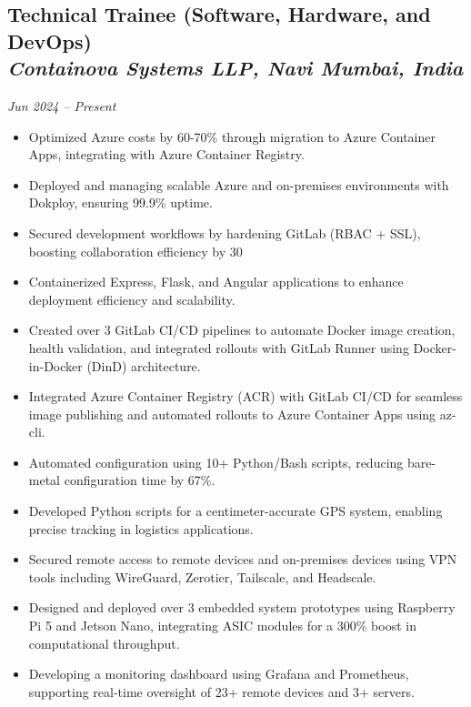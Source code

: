 \documentclass[a4paper,11pt]{article}
\begin{document}
\subsection*{Technical Trainee (Software, Hardware, and DevOps) \\
\textit{Containova Systems LLP, Navi Mumbai, India}}
\textit{Jun 2024 -- Present}
\begin{itemize}[leftmargin=*,labelsep=5pt]
    \item Optimized Azure costs by 60-70\% through migration to Azure Container Apps, integrating with Azure Container Registry.
    \item Deployed and managing scalable Azure and on-premises environments with Dokploy, ensuring 99.9\% uptime.
    \item Secured development workflows by hardening GitLab (RBAC + SSL), boosting collaboration efficiency by 30%
    \item Containerized Express, Flask, and Angular applications to enhance deployment efficiency and scalability.
    \item Created over 3 GitLab CI/CD pipelines to automate Docker image creation, health validation, and integrated rollouts with GitLab Runner using Docker-in-Docker (DinD) architecture.
    \item Integrated Azure Container Registry (ACR) with GitLab CI/CD for seamless image publishing and automated rollouts to Azure Container Apps using az-cli.
    \item Automated configuration using 10+ Python/Bash scripts, reducing bare-metal configuration time by 67\%.
    \item Developed Python scripts for a centimeter-accurate GPS system, enabling precise tracking in logistics applications.
    \item Secured remote access to remote devices and on-premises devices using VPN tools including WireGuard, Zerotier, Tailscale, and Headscale.
    \item Designed and deployed over 3 embedded system prototypes using Raspberry Pi 5 and Jetson Nano, integrating ASIC modules for a 300\% boost in computational throughput.
    \item Developing a monitoring dashboard using Grafana and Prometheus, supporting real-time oversight of 23+ remote devices and 3+ servers.
\end{itemize}
\end{document}
